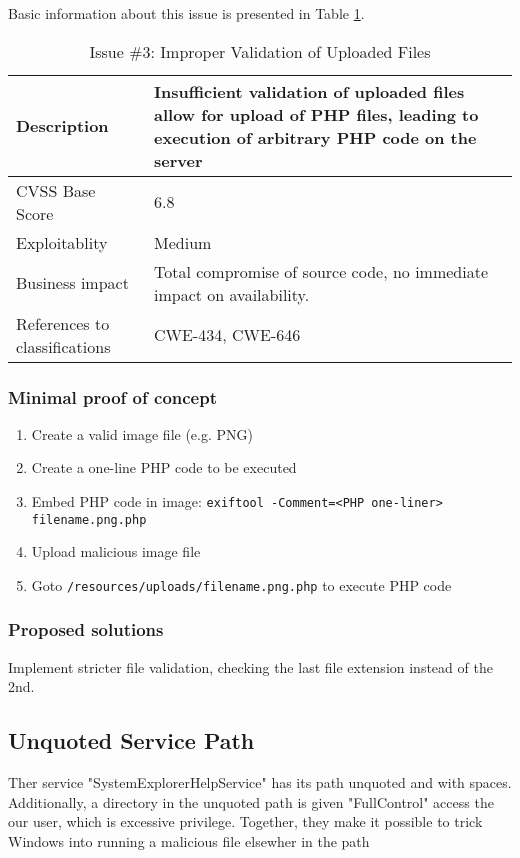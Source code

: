 Basic information about this issue is presented in Table \ref{tbl:issue-3}.
\begin{table}[h]
	\centering
	\begin{tabular}{| l | p{10cm} |}
		\hline
		Description & Insufficient validation of uploaded files allow for upload of PHP files, leading to execution of arbitrary PHP code on the server \\
		\hline
		CVSS Base Score & 6.8 \\
		\hline
		Exploitablity & Medium \\
		\hline
		Business impact & Total compromise of source code, no immediate impact on availability.  \\
		\hline
		References to classifications & CWE-434, CWE-646 \\
		\hline
	\end{tabular}
	\caption{Issue \#3: Improper Validation of Uploaded Files}
	\label{tbl:issue-3}
\end{table}

\subsubsection{Minimal proof of concept}
\begin{enumerate}
  \item Create a valid image file (e.g. PNG)
  \item Create a one-line PHP code to be executed
  \item Embed PHP code in image: \lstinline{exiftool -Comment=<PHP one-liner> filename.png.php}
  \item Upload malicious image file
  \item Goto \lstinline{/resources/uploads/filename.png.php} to execute PHP code
\end{enumerate}

\subsubsection{Proposed solutions} \label{solution:issue-3}
Implement stricter file validation, checking the last file extension instead of the 2nd.

\subsection{Unquoted Service Path} \label{ss:issue-4}
Ther service "SystemExplorerHelpService" has its path unquoted and with spaces. Additionally, a directory in the unquoted path is given "FullControl" access the our user, which is excessive privilege. Together, they make it possible to trick Windows into running a malicious file elsewher in the path


